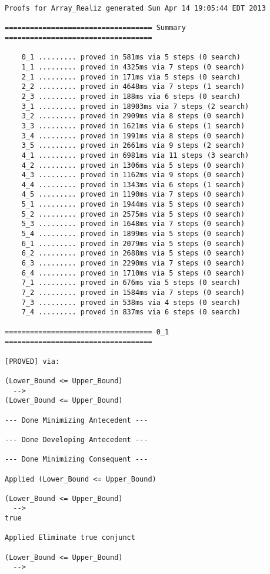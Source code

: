 \begin{lstlisting}[language=resolve]
Proofs for Array_Realiz generated Sun Apr 14 19:05:44 EDT 2013

=================================== Summary ===================================

	0_1	......... proved in 581ms via 5 steps (0 search)
	1_1	......... proved in 4325ms via 7 steps (0 search)
	2_1	......... proved in 171ms via 5 steps (0 search)
	2_2	......... proved in 4648ms via 7 steps (1 search)
	2_3	......... proved in 188ms via 6 steps (0 search)
	3_1	......... proved in 18903ms via 7 steps (2 search)
	3_2	......... proved in 2909ms via 8 steps (0 search)
	3_3	......... proved in 1621ms via 6 steps (1 search)
	3_4	......... proved in 1991ms via 8 steps (0 search)
	3_5	......... proved in 2661ms via 9 steps (2 search)
	4_1	......... proved in 6981ms via 11 steps (3 search)
	4_2	......... proved in 1306ms via 5 steps (0 search)
	4_3	......... proved in 1162ms via 9 steps (0 search)
	4_4	......... proved in 1343ms via 6 steps (1 search)
	4_5	......... proved in 1190ms via 7 steps (0 search)
	5_1	......... proved in 1944ms via 5 steps (0 search)
	5_2	......... proved in 2575ms via 5 steps (0 search)
	5_3	......... proved in 1648ms via 7 steps (0 search)
	5_4	......... proved in 1899ms via 5 steps (0 search)
	6_1	......... proved in 2079ms via 5 steps (0 search)
	6_2	......... proved in 2688ms via 5 steps (0 search)
	6_3	......... proved in 2290ms via 7 steps (0 search)
	6_4	......... proved in 1710ms via 5 steps (0 search)
	7_1	......... proved in 676ms via 5 steps (0 search)
	7_2	......... proved in 1584ms via 7 steps (0 search)
	7_3	......... proved in 538ms via 4 steps (0 search)
	7_4	......... proved in 837ms via 6 steps (0 search)

=================================== 0_1 ===================================

[PROVED] via:

(Lower_Bound <= Upper_Bound)
  -->
(Lower_Bound <= Upper_Bound)

--- Done Minimizing Antecedent ---

--- Done Developing Antecedent ---

--- Done Minimizing Consequent ---

Applied (Lower_Bound <= Upper_Bound)

(Lower_Bound <= Upper_Bound)
  -->
true

Applied Eliminate true conjunct

(Lower_Bound <= Upper_Bound)
  -->



\end{lstlisting}
